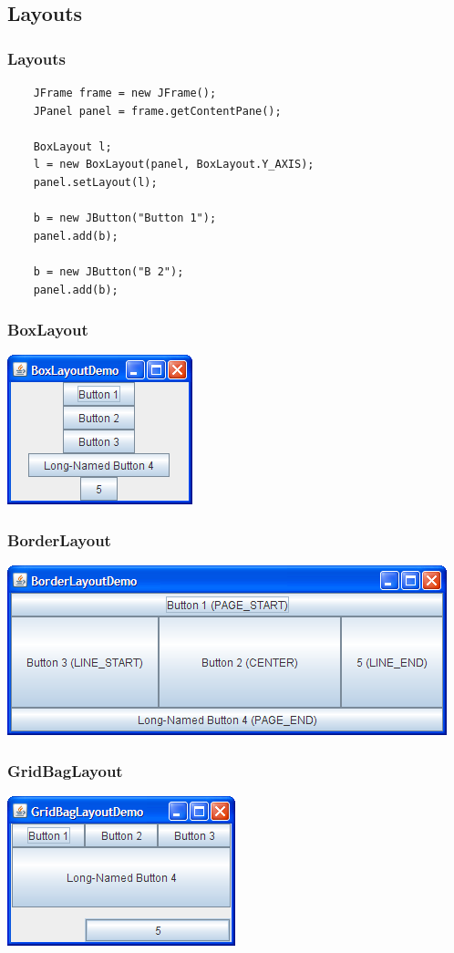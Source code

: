 \subsection{Layouts}

\begin{frame}[fragile]
	\frametitle{Layouts}
	\begin{verbatim}
	JFrame frame = new JFrame();
	JPanel panel = frame.getContentPane();

	BoxLayout l;
	l = new BoxLayout(panel, BoxLayout.Y_AXIS);
	panel.setLayout(l);

	b = new JButton("Button 1");
	panel.add(b);

	b = new JButton("B 2");
	panel.add(b);
	\end{verbatim}
\end{frame}

\begin{frame}[fragile]
	\frametitle{BoxLayout}
	\includegraphics[scale=1]{BoxLayoutDemo.png}
\end{frame}

\begin{frame}[fragile]
	\frametitle{BorderLayout}
	\includegraphics[scale=0.7]{BorderLayoutDemo.png}
\end{frame}

\begin{frame}[fragile]
	\frametitle{GridBagLayout}
	\includegraphics[scale=1]{GridBagLayoutDemo.png}
\end{frame}


